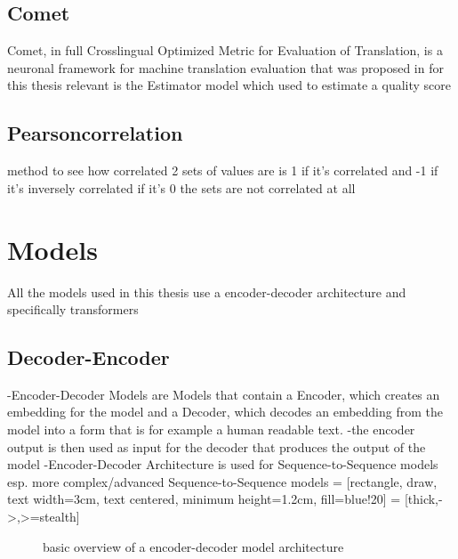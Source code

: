 \subsection{Comet}
Comet, in full Crosslingual Optimized Metric for Evaluation of Translation, is a neuronal framework for machine translation evaluation that was proposed in \cite{rei-etal-2020-comet} 
for this thesis relevant is the Estimator model which used to estimate a quality score 

\subsection{Pearsoncorrelation}
method to see how correlated 2 sets of values are
is 1 if it's correlated and -1 if it's inversely correlated 
if it's 0 the sets are not correlated at all

\section{Models}
All the models used in this thesis use a encoder-decoder architecture and specifically transformers
\subsection{Decoder-Encoder}
-Encoder-Decoder Models are Models that contain a Encoder, which creates an embedding for the model
and a Decoder, which decodes an embedding from the model into a form that is for example a human readable text. 
-the encoder output is then used as input for the decoder that produces the output of the model 
-Encoder-Decoder Architecture is used for Sequence-to-Sequence models esp. more complex/advanced Sequence-to-Sequence models 
 = [rectangle, draw, text width=3cm, text centered, minimum height=1.2cm, fill=blue!20]
 = [thick,->,>=stealth]
\begin{figure}
    \centering
{}
\label{fig:encoder-decoder model}
\caption{basic overview of a encoder-decoder model architecture}
\end{figure}

